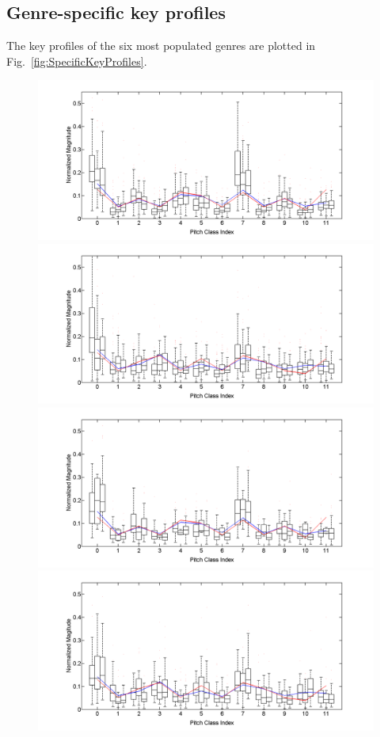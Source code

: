 \documentclass{article}
\begin{document}
\subsection{Genre-specific key profiles}
The key profiles of the six most populated genres are plotted in Fig.~\ref{fig:SpecificKeyProfiles}.
\begin{figure}[tb]
\centering
    \includegraphics[scale=.2]{graph/boxPlotsMajCPR+Krum+Temp}
    \includegraphics[scale=.2]{graph/boxPlotsMinBHP+Krum+Temp}
    \includegraphics[scale=.2]{graph/boxPlotsMajDJRk+Krum+Temp}
    \includegraphics[scale=.2]{graph/boxPlotsMinDMR+Krum+Temp}

\end{figure}
\end{document}
